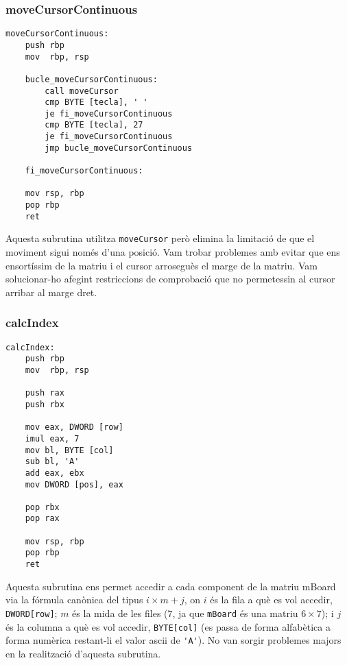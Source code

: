 \documentclass[a4paper,12pt]{article}
\begin{document}
\subsubsection{moveCursorContinuous}
\begin{lstlisting}[firstnumber=454]
moveCursorContinuous:
	push rbp
	mov  rbp, rsp

	bucle_moveCursorContinuous:
		call moveCursor
		cmp BYTE [tecla], ' '
		je fi_moveCursorContinuous
		cmp BYTE [tecla], 27  
		je fi_moveCursorContinuous
		jmp bucle_moveCursorContinuous

	fi_moveCursorContinuous:

	mov rsp, rbp
	pop rbp
	ret
\end{lstlisting}
Aquesta subrutina utilitza \lstinline|moveCursor| però elimina la limitació de que el moviment sigui només d'una posició. Vam trobar problemes amb evitar que ens ensortíssim de la matriu i el cursor arroseguès el marge de la matriu. Vam solucionar-ho afegint restriccions de comprobació que no permetessin al cursor arribar al marge dret.
\clearpage
\subsubsection{calcIndex}
\begin{lstlisting}[firstnumber=485]
calcIndex:
	push rbp
	mov  rbp, rsp

	push rax
	push rbx
	
	mov eax, DWORD [row]
	imul eax, 7
	mov bl, BYTE [col]
	sub bl, 'A'
	add eax, ebx
	mov DWORD [pos], eax

	pop rbx
	pop rax
	 
	mov rsp, rbp
	pop rbp
	ret
\end{lstlisting}
Aquesta subrutina ens permet accedir a cada component de la matriu mBoard via la fórmula canònica del tipus $i \times m + j$, on $i$ és la fila a què es vol accedir, \lstinline|DWORD[row]|; $m$ és la mida de les files ($7$, ja que \lstinline|mBoard| és una matriu $6\times 7$); i $j$ és la columna a què es vol accedir, \lstinline|BYTE[col]| (es passa de forma alfabètica a forma numèrica restant-li el valor ascii de \lstinline|'A'|). No van sorgir problemes majors en la realització d'aquesta subrutina. 
\clearpage
\end{document}
